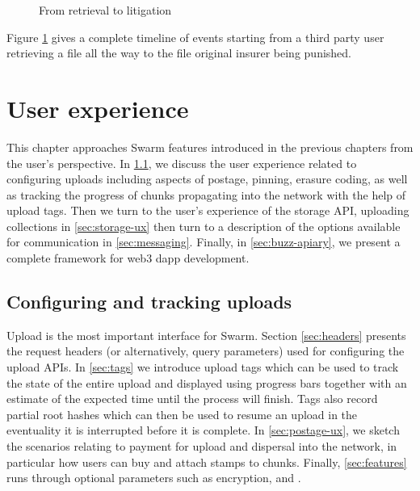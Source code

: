 \begin{figure}[htbp]
  \centering
  \caption[From retrieval to litigation \statusred]{From retrieval to litigation}
  \label{fig:flowchart-retrieval-litigation}
\end{figure}


Figure \ref{fig:flowchart-retrieval-litigation} gives a complete timeline of events starting from a third party user retrieving a file all the way to the file original insurer being punished.





\chapter{User experience}\label{sec:ux}

This chapter approaches Swarm features introduced in the previous chapters from the user's perspective. In \ref{sec:upload}, we discuss the user experience related to configuring uploads including aspects of postage, pinning, erasure coding, as well as tracking the progress of chunks propagating into the network with the help of upload tags. Then we turn to the user's experience of the storage API, uploading collections in \ref{sec:storage-ux} then turn to a description of the options available for communication in \ref{sec:messaging}. Finally, in \ref{sec:buzz-apiary}, we present a complete framework for web3 dapp development.

\section{Configuring and tracking uploads \statusgreen}\label{sec:upload}

\green{}

Upload is the most important interface for Swarm. Section \ref{sec:headers} presents the request headers (or alternatively, query parameters) used for configuring the upload APIs. In \ref{sec:tags} we introduce upload tags which can be used to track the state of the entire upload and displayed using progress bars together with an estimate of the expected time until the process will finish. Tags also record partial root hashes which can then be used to resume an upload in the eventuality it is interrupted before it is complete. In \ref{sec:postage-ux}, we sketch the scenarios relating to payment for upload and dispersal into the network, in particular how users can buy and attach stamps to chunks. Finally, \ref{sec:features} runs through optional parameters such as encryption,  and .

